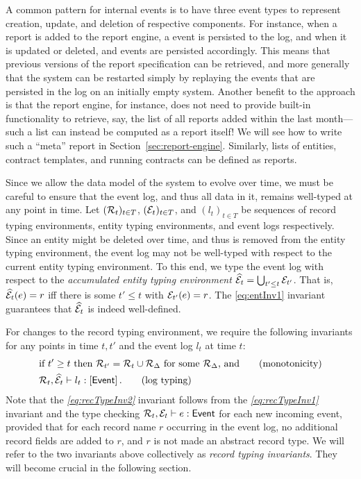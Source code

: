 A common pattern for internal events is to have three event types to
represent creation, update, and deletion of respective components. For
instance, when a report is added to the report engine, a
 event is persisted to the log, and when it
is updated or deleted,  and
 events are persisted accordingly. This means
that previous versions of the report specification can be retrieved,
and more generally that the system can be restarted simply by
replaying the events that are persisted in the log on an initially
empty system.  Another benefit to the approach is that the report
engine, for instance, does not need to provide built-in functionality
to retrieve, say, the list of all reports added within the last
month---such a list can instead be computed as a report itself! We
will see how to write such a ``meta'' report in
Section~\ref{sec:report-engine}. Similarly, lists of entities,
contract templates, and running contracts can be defined as reports.

Since we allow the data model of the system to evolve over time, we
must be careful to ensure that the event log, and thus all data in it,
remains well-typed at any point in time. Let $({\mathcal R}_t)_{t\in T}$,
$({\mathcal E}_t)_{t\in T}$, and $(l_t)_{t\in T}$ be sequences of record
typing environments, entity typing environments, and event logs
respectively. Since an entity might be deleted over time, and thus is
removed from the entity typing environment, the event log may not be
well-typed with respect to the current entity typing environment. To
this end, we type the event log with respect to the \emph{accumulated
  entity typing environment} $\widehat{{\mathcal E}}_t = \bigcup_{t'\le t}
{\mathcal E}_{t'}$. That is, $\widehat{{\mathcal E}}_t(e) = r$ iff there is some $t'
\le t$ with ${\mathcal E}_{t'}(e) = r$. The \ref{eq:entInv1} invariant
guarantees that $\widehat{{\mathcal E}}_t$ is indeed well-defined.

For changes to the record typing environment, we require the following
invariants for any points in time $t,t'$ and the event log $l_t$ at
time $t$:
\begin{align}
  &\text{if } t' \ge t \text{ then } {\mathcal R}_{t'} = {\mathcal R}_t \cup {\mathcal R}_\Delta
  \text{ for some } {\mathcal R}_\Delta \text{, and} \tag{monotonicity}\label{eq:recTypeInv1}\\
  &{\mathcal R}_t, \widehat{{\mathcal E}}_t \vdash l_t : \left[\mathsf{Event}\right].
  \tag{log typing}\label{eq:recTypeInv2}
\end{align}
Note that the \emph{\ref{eq:recTypeInv2}} invariant follows from the
\emph{\ref{eq:recTypeInv1}} invariant and the type checking
${\mathcal R}_t, {\mathcal E}_t \vdash e : \mathsf{Event}$ for each new
incoming event, provided that for each record name $r$ occurring in the
event log, no additional record fields are added to $r$, and $r$ is
not made an abstract record type. We will refer to the two invariants
above collectively as \emph{record typing invariants}. They will
become crucial in the following section.

